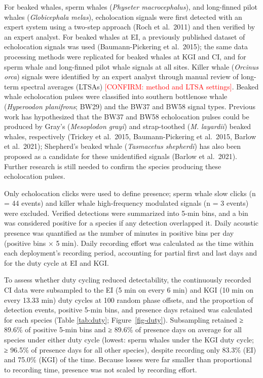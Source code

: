 \documentclass[
  11pt,
]{article}
\newcommand{\conf}[1]{\textcolor{red}{[CONFIRM: #1]}}
\begin{document}
For beaked whales, sperm whales (\emph{Physeter macrocephalus}), and
long-finned pilot whales (\emph{Globicephala melas}), echolocation
signals were first detected with an expert system using a two-step
approach (Roch et al.~2011) and then verified by an expert analyst. For
beaked whales at EI, a previously published dataset of echolocation
signals was used (Baumann-Pickering et al.~2015); the same data
processing methods were replicated for beaked whales at KGI and CI, and
for sperm whale and long-finned pilot whale signals at all sites. Killer
whale (\emph{Orcinus orca}) signals were identified by an expert analyst
through manual review of long-term spectral averages (LTSAs)
\conf{method and LTSA settings}. Beaked whale echolocation pulses were
classified into southern bottlenose whale (\emph{Hyperoodon planifrons};
BW29) and the BW37 and BW58 signal types. Previous work has hypothesized
that the BW37 and BW58 echolocation pulses could be produced by Gray's
(\emph{Mesoplodon grayi}) and strap-toothed (\emph{M. layardii}) beaked
whales, respectively (Trickey et al.~2015, Baumann-Pickering et
al.~2015, Barlow et al.~2021); Shepherd's beaked whale (\emph{Tasmacetus
shepherdi}) has also been proposed as a candidate for these unidentified
signals (Barlow et al.~2021). Further research is still needed to
confirm the species producing these echolocation pulses.

Only echolocation clicks were used to define presence; sperm whale slow
clicks (n = 44 events) and killer whale high-frequency modulated signals
(n = 3 events) were excluded. Verified detections were summarized into
5-min bins, and a bin was considered positive for a species if any
detection overlapped it. Daily acoustic presence was quantified as the
number of minutes in positive bins per day (positive bins × 5 min).
Daily recording effort was calculated as the time within each
deployment's recording period, accounting for partial first and last
days and for the duty cycle at EI and KGI.

To assess whether duty cycling reduced detectability, the continuously
recorded CI data were subsampled to the EI (5 min on every 6 min) and
KGI (10 min on every 13.33 min) duty cycles at 100 random phase offsets,
and the proportion of detection events, positive 5-min bins, and
presence days retained was calculated for each species (Table
\ref{tab:duty}; Figure~\ref{fig-duty}). Subsampling retained ≥ 89.6\% of
positive 5-min bins and ≥ 89.6\% of presence days on average for all
species under either duty cycle (lowest: sperm whales under the KGI duty
cycle; ≥ 96.5\% of presence days for all other species), despite
recording only 83.3\% (EI) and 75.0\% (KGI) of the time. Because losses
were far smaller than proportional to recording time, presence was not
scaled by recording effort.
\end{document}
